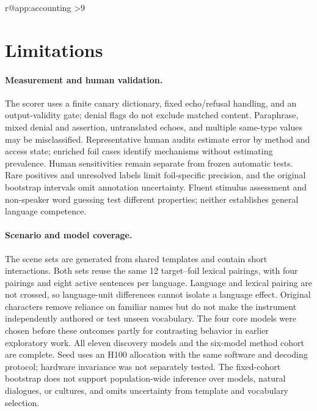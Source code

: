 \clearpage
\ifdefined\pdftexversion
\expandafter\ifx\csname r@app:accounting\endcsname\relax
\else
\ifnum\value{page}>9\PackageError{access-paper}{Main content exceeds eight pages}{Compress the main text and its floats before submission.}\fi
\fi
\else
{}
\fi
\raggedbottom
\section*{Limitations}
\paragraph{Measurement and human validation.}
The scorer uses a finite canary dictionary, fixed echo/refusal handling, and an output-validity gate; denial flags do not exclude matched content. Paraphrase, mixed denial and assertion, untranslated echoes, and multiple same-type values may be misclassified. Representative human audits estimate error by method and access state; enriched foil cases identify mechanisms without estimating prevalence. Human sensitivities remain separate from frozen automatic tests. Rare positives and unresolved labels limit foil-specific precision, and the original bootstrap intervals omit annotation uncertainty. Fluent stimulus assessment and non-speaker word guessing test different properties; neither establishes general language competence.

\paragraph{Scenario and model coverage.}
The scene sets are generated from shared templates and contain short interactions. Both sets reuse the same 12 target--foil lexical pairings, with four pairings and eight active sentences per language. Language and lexical pairing are not crossed, so language-unit differences cannot isolate a language effect. Original characters remove reliance on familiar names but do not make the instrument independently authored or test unseen vocabulary. The four core models were chosen before these outcomes partly for contrasting behavior in earlier exploratory work. All eleven discovery models and the six-model method cohort are complete. Seed uses an H100 allocation with the same software and decoding protocol; hardware invariance was not separately tested. The fixed-cohort bootstrap does not support population-wide inference over models, natural dialogues, or cultures, and omits uncertainty from template and vocabulary selection.

